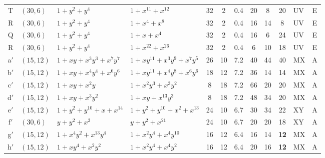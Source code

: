 \begin{table}[t]
\begin{tabular*}{\textwidth}{@{\extracolsep{\fill}}clllcccccclc}
T & $(30,6)$ & $1{+}y^{2}{+}y^{4}$ & $1{+}x^{11}{+}x^{12}$ & 32 & 2 & 0.4 & 20 & 8 & 20 & UV & E \\
R & $(30,6)$ & $1{+}y^{2}{+}y^{4}$ & $1{+}x^{4}{+}x^{8}$ & 32 & 2 & 0.4 & 16 & 14 & 8 & UV & E \\
Q & $(30,6)$ & $1{+}y^{2}{+}y^{4}$ & $1{+}x{+}x^{4}$ & 32 & 2 & 0.4 & 16 & 6 & 24 & UV & E \\
R & $(30,6)$ & $1{+}y^{2}{+}y^{4}$ & $1{+}x^{22}{+}x^{26}$ & 32 & 2 & 0.4 & 6 & 10 & 18 & UV & E \\
\midrule
a$'$ & $(15,12)$ & $1{+}xy{+}x^{3}y^{3}{+}x^{7}y^{7}$ & $1{+}xy^{11}{+}x^{3}y^{9}{+}x^{7}y^{5}$ & 26 & 10 & 7.2 & 40 & 44 & 40 & MX & A \\
b$'$ & $(15,12)$ & $1{+}xy{+}x^{4}y^{4}{+}x^{6}y^{6}$ & $1{+}xy^{11}{+}x^{4}y^{8}{+}x^{6}y^{6}$ & 18 & 12 & 7.2 & 36 & 14 & 14 & MX & A \\
c$'$ & $(15,12)$ & $1{+}xy{+}x^{2}y$ & $1{+}x^{2}y^{3}{+}x^{3}y^{2}$ & 8 & 18 & 7.2 & 66 & 20 & 20 & MX & A \\
d$'$ & $(15,12)$ & $1{+}xy{+}x^{3}y^{2}$ & $1{+}xy{+}x^{13}y^{3}$ & 8 & 18 & 7.2 & 48 & 34 & 20 & MX & A \\
e$'$ & $(15,12)$ & $1{+}y^{2}{+}y^{10}{+}x{+}x^{14}$ & $1{+}y^{2}{+}y^{10}{+}x^{2}{+}x^{13}$ & 24 & 10 & 6.7 & 30 & 34 & 22 & XY & A \\
f$'$ & $(30,6)$ & $y{+}y^{2}{+}x^{3}$ & $y{+}y^{2}{+}x^{21}$ & 24 & 10 & 6.7 & 20 & 20 & 18 & XY & A \\
g$'$ & $(15,12)$ & $1{+}x^{4}y^{2}{+}x^{13}y^{4}$ & $1{+}x^{2}y^{4}{+}x^{4}y^{10}$ & 16 & 12 & 6.4 & 16 & 14 & \textbf{12} & MX & A \\
h$'$ & $(15,12)$ & $1{+}xy^{4}{+}x^{2}y^{2}$ & $1{+}x^{2}y^{4}{+}x^{4}y^{2}$ & 16 & 12 & 6.4 & 20 & 16 & \textbf{12} & MX & A \\
\bottomrule
\end{tabular*}
\end{table}
